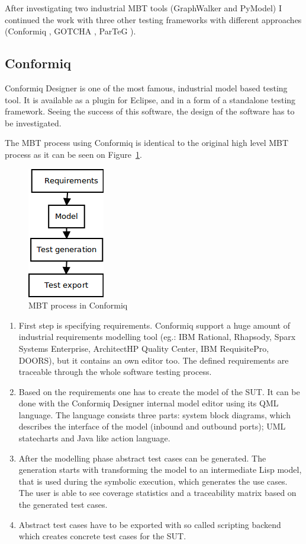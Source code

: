 \documentclass{article}
\begin{document}
After investigating two industrial MBT tools (GraphWalker and PyModel) I continued the work with three other testing frameworks with different approaches (Conformiq \cite{conformiq}\cite{conformiqweb}, GOTCHA \cite{gotcha}, ParTeG \cite{parteg}\cite{partegweb}).

\subsection{Conformiq}
\label{sub:conformiq}

Conformiq Designer is one of the most famous, industrial model based testing tool. It is available as a plugin for Eclipse, and in a form of a standalone testing framework. Seeing the success of this software, the design of the software has to be investigated.

The MBT process using Conformiq is identical to the original high level MBT process as it can be seen on Figure~\ref{fig:conformiq_process}.

\begin{figure}[htp]
\centering
\includegraphics[scale=0.6]{img/conformiq_process.png}
\caption{MBT process in Conformiq}
\label{fig:conformiq_process}
\end{figure}

\begin{enumerate}
	\item First step is specifying requirements. Conformiq support a huge amount of industrial requirements modelling tool (eg.: IBM Rational, Rhapsody, Sparx Systems Enterprise, ArchitectHP Quality Center, IBM RequisitePro, DOORS), but it contains an own editor too. The defined requirements are traceable through the whole software testing process.
	\item Based on the requirements one has to create the model of the SUT. It can be done with the Conformiq Designer internal model editor using its QML language. The language consists three parts: system block diagrams, which describes the interface of the model (inbound and outbound ports); UML statecharts and Java like action language.
	\item After the modelling phase abstract test cases can be generated. The generation starts with transforming the model to an intermediate Lisp model, that is used during the symbolic execution, which generates the use cases. The user is able to see coverage statistics and a traceability matrix based on the generated test cases.
	\item Abstract test cases have to be exported with so called scripting backend which creates concrete test cases for the SUT.
\end{enumerate}
\end{document}
